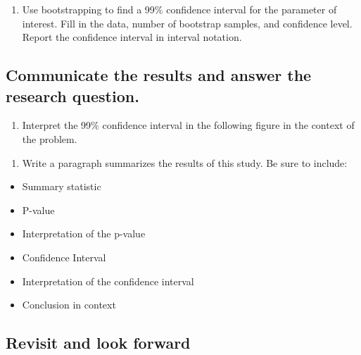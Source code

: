 \documentclass[
]{report}
\providecommand{\tightlist}{%
  \setlength{\itemsep}{0pt}\setlength{\parskip}{0pt}}
\begin{document}
\begin{enumerate}
\def\labelenumi{\arabic{enumi}.}
\setcounter{enumi}{16}
\tightlist
\item
  Use bootstrapping to find a 99\% confidence interval for the parameter of interest. Fill in the data, number of bootstrap samples, and confidence level. Report the confidence interval in interval notation.
\end{enumerate}

\vspace{1in}

\hypertarget{communicate-the-results-and-answer-the-research-question.}{%
\subsection{Communicate the results and answer the research question.}\label{communicate-the-results-and-answer-the-research-question.}}

\begin{enumerate}
\def\labelenumi{\arabic{enumi}.}
\setcounter{enumi}{17}
\tightlist
\item
  Interpret the 99\% confidence interval in the following figure in the context of the problem.
\end{enumerate}

\vspace{1in}

\begin{enumerate}
\def\labelenumi{\arabic{enumi}.}
\setcounter{enumi}{18}
\tightlist
\item
  Write a paragraph summarizes the results of this study. Be sure to include:
\end{enumerate}

\begin{itemize}
\item
  Summary statistic
\item
  P-value
\item
  Interpretation of the p-value
\item
  Confidence Interval
\item
  Interpretation of the confidence interval
\item
  Conclusion in context
\end{itemize}

\vspace{3in}

\hypertarget{revisit-and-look-forward}{%
\subsection{Revisit and look forward}\label{revisit-and-look-forward}}
\end{document}

